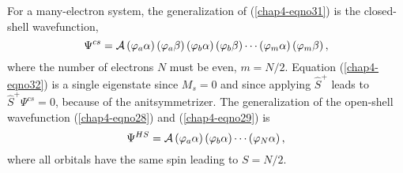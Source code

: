 For a many-electron system, the generalization of (\ref{chap4-eqno31})
is the closed-shell wavefunction,
\begin{equation}
\Psi^{cs} = {\cal A} \left( \varphi_a \alpha \right) \left( \varphi_a \beta 
\right) \left( \varphi_b \alpha \right) \left( \varphi_b \beta \right) \cdots 
\left( \varphi_m \alpha \right) \left( \varphi_m \beta \right) ,
\label{chap4-eqno32}
\end{equation}
where the number of electrons $N$ must be even, $m = N/2$. Equation
(\ref{chap4-eqno32}) is a single eigenstate since $M_s = 0$ and since
applying $\hat{S}^+$ leads to $\hat{S}^+ \Psi^{cs} = 0$, because of
the anitsymmetrizer.  The generalization of the open-shell
wavefunction (\ref{chap4-eqno28}) and (\ref{chap4-eqno29}) is
\begin{equation}
\Psi^{HS} = {\cal A} \left( \varphi_a \alpha \right) \left( \varphi_b \alpha 
\right) \cdots \left( \varphi_N \alpha 
\right) ,
\label{chap4-eqno33}
\end{equation}
where all orbitals have the same spin leading to $S = N/2$.

